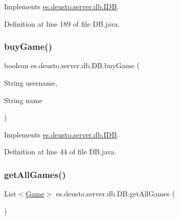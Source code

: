 Implements \hyperlink{interfacees_1_1deusto_1_1server_1_1db_1_1_i_d_b_ab2c9cbce259134d238e56eea5d0134c5}{es.\+deusto.\+server.\+db.\+I\+DB}.



Definition at line 189 of file D\+B.\+java.

\mbox{\label{classes_1_1deusto_1_1server_1_1db_1_1_d_b_a8aa2e7531181a31b54850ca6665f87c2}} 
\subsubsection{\texorpdfstring{buy\+Game()}{buyGame()}}
{\footnotesize\ttfamily boolean es.\+deusto.\+server.\+db.\+D\+B.\+buy\+Game (\begin{DoxyParamCaption}\item[{String}]{username,  }\item[{String}]{name }\end{DoxyParamCaption})}



Implements \hyperlink{interfacees_1_1deusto_1_1server_1_1db_1_1_i_d_b_ab1076d02bd6b4da29d0e99e1310048b6}{es.\+deusto.\+server.\+db.\+I\+DB}.



Definition at line 44 of file D\+B.\+java.

\mbox{\label{classes_1_1deusto_1_1server_1_1db_1_1_d_b_ad878c1c58062596b5e1b582ed496bd11}} 
\subsubsection{\texorpdfstring{get\+All\+Games()}{getAllGames()}}
{\footnotesize\ttfamily List$<$\hyperlink{classes_1_1deusto_1_1server_1_1db_1_1data_1_1_game}{Game}$>$ es.\+deusto.\+server.\+db.\+D\+B.\+get\+All\+Games (\begin{DoxyParamCaption}{ }\end{DoxyParamCaption})}



